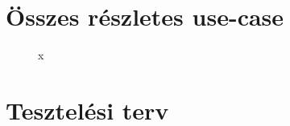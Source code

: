 \section{Összes részletes use-case}

\begin{figure}[h]
\begin{center}
\caption{x}
\label{fig:ProtoUseCase}
\end{center}
\end{figure}

\section{Tesztelési terv}

